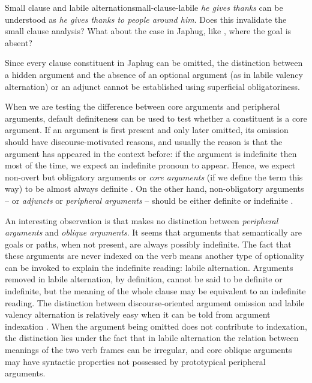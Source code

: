 \documentclass[a4paper, oneside, 12pt]{report}
\newcommand*{\citesec}[1]{\S~{#1}}
\newcommand*{\term}[1]{\emph{#1}}
\newcommand{\form}[1]{\emph{#1}}
\begin{document}
\begin{todobox}{Small clause and labile alternation}{small-clause-labile}
    \form{he gives thanks} can be understood as
    \form{he gives thanks to people around him}.
    Does this invalidate the small clause analysis?
    What about the case in Japhug,
    like \citep[\citesec{22.1.2.2}, (29)]{jacques2021grammar},
    where the goal is absent?
\end{todobox}

Since every clause constituent in Japhug can be omitted,
the distinction between a hidden argument 
and the absence of an optional argument (as in labile valency alternation) or an adjunct 
cannot be established using superficial obligatoriness.

When we are testing the difference between core arguments and peripheral arguments,
default definiteness can be used to test whether a constituent is a core argument.
If an argument is first present and only later omitted, 
its omission should have discourse-motivated reasons,
and usually the reason is that the argument has appeared in the context before:
if the argument is indefinite then most of the time, we expect an indefinite pronoun to appear.
Hence, we expect non-overt but obligatory arguments or \term{core arguments}
(if we define the term this way)
to be almost always definite \citep[\citesec{22.1.2.1}]{jacques2021grammar}.
On the other hand, non-obligatory arguments 
-- or \term{adjuncts} or \term{peripheral arguments} --
should be either definite or indefinite
\citep[\citesec{22.1.2.2}]{jacques2021grammar}.

An interesting observation is that \citet[\citesec{22.1.2.2}]{jacques2021grammar}
makes no distinction between \emph{peripheral arguments} and
\emph{oblique arguments}.
It seems that arguments that semantically are goals or paths,
when not present, are always possibly indefinite.
The fact that these arguments are never indexed on the verb
means another type of optionality can be invoked to explain
the indefinite reading: labile alternation. 
Arguments removed in labile alternation, by definition,
cannot be said to be definite or indefinite,
but the meaning of the whole clause may be equivalent to an indefinite reading.
The distinction between discourse-oriented argument omission and labile valency alternation 
is relatively easy when it can be told from argument indexation
\citep[\citesec{22.1.2.1}]{jacques2021grammar}.
When the argument being omitted does not contribute to indexation,
the distinction lies under the fact that in labile alternation
the relation between meanings of the two verb frames can be irregular,
and core oblique arguments may have syntactic properties 
not possessed by prototypical peripheral arguments. 
\end{document}
